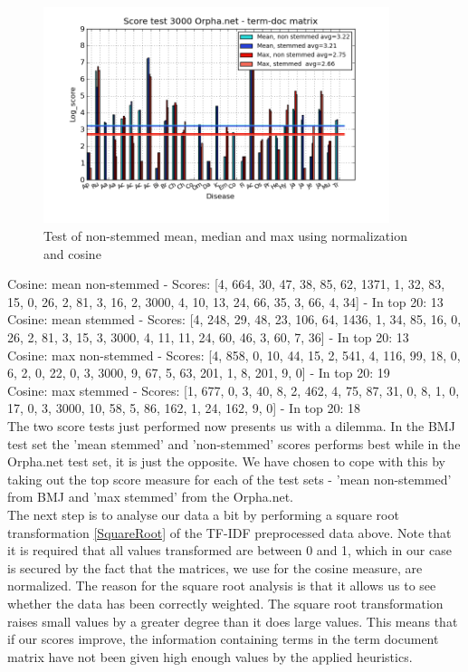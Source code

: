 \begin{figure}[h!]
        \begin{center}
          \includegraphics[width=0.9\textwidth]{barcharts/termDoc_orphan_hist_3000_ns_mea_s_mea_ns_max_s_max.png}
        \end{center}
        \caption{Test of non-stemmed mean, median and max using normalization and cosine}
        \label{termDoc_orphan_hist_3000_ns_mea_s_mea_ns_max_s_max}
\end{figure}
 
Cosine: mean non-stemmed - Scores: [4, 664, 30, 47, 38, 85, 62, 1371, 1, 32, 83, 15, 0, 26, 2, 81, 3, 16, 2, 3000, 4, 10, 13, 24, 66, 35, 3, 66, 4, 34] - In top 20: 13 \\
Cosine: mean stemmed - Scores: [4, 248, 29, 48, 23, 106, 64, 1436, 1, 34, 85, 16, 0, 26, 2, 81, 3, 15, 3, 3000, 4, 11, 11, 24, 60, 46, 3, 60, 7, 36] - In top 20: 13 \\
Cosine: max non-stemmed - Scores: [4, 858, 0, 10, 44, 15, 2, 541, 4, 116, 99, 18, 0, 6, 2, 0, 22, 0, 3, 3000, 9, 67, 5, 63, 201, 1, 8, 201, 9, 0] - In top 20: 19 \\
Cosine: max stemmed - Scores: [1, 677, 0, 3, 40, 8, 2, 462, 4, 75, 87, 31, 0, 8, 1, 0, 17, 0, 3, 3000, 10, 58, 5, 86, 162, 1, 24, 162, 9, 0] - In top 20: 18 \\

The two score tests just performed now presents us with a dilemma. In the BMJ test set the 'mean stemmed' and 'non-stemmed' scores performs best while in the Orpha.net test set, it is just the opposite. We have chosen to cope with this by taking out the top score measure for each of the test sets - 'mean non-stemmed' from BMJ and 'max stemmed' from the Orpha.net. \\

The next step is to analyse our data a bit by performing a square root transformation \ref{SquareRoot} of the TF-IDF preprocessed data above. Note that it is required that all values transformed are between 0 and 1, which in our case is secured by the fact that the matrices, we use for the cosine measure, are normalized. The reason for the square root analysis is that it allows us to see whether the data has been correctly weighted. The square root transformation raises small values by a greater degree than it does large values. This means that if our scores improve, the information containing terms in the term document matrix have not been given high enough values by the applied heuristics. \\


